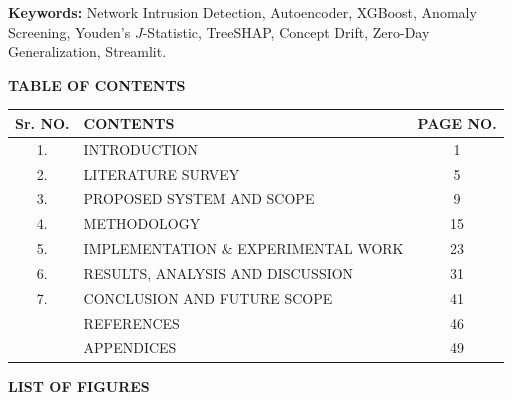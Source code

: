\documentclass[12pt,a4paper]{report}
\begin{document}
\noindent
\textbf{Keywords:} Network Intrusion Detection, Autoencoder, XGBoost, Anomaly Screening, Youden's $J$-Statistic, TreeSHAP, Concept Drift, Zero-Day Generalization, Streamlit.

\clearpage
{}
\setcounter{page}{6}
\thispagestyle{plain}

\begin{center}
{\Large\bfseries TABLE OF CONTENTS}\\[0.4cm]
\end{center}

\noindent
\begin{tabularx}{\textwidth}{|c|X|c|}
\hline
\textbf{Sr. NO.} & \textbf{\centering CONTENTS} & \textbf{PAGE NO.} \\
\hline
1. & INTRODUCTION & 1 \\
\hline
2. & LITERATURE SURVEY & 5 \\
\hline
3. & PROPOSED SYSTEM AND SCOPE & 9 \\
\hline
4. & METHODOLOGY & 15 \\
\hline
5. & IMPLEMENTATION \& EXPERIMENTAL WORK & 23 \\
\hline
6. & RESULTS, ANALYSIS AND DISCUSSION & 31 \\
\hline
7. & CONCLUSION AND FUTURE SCOPE & 41 \\
\hline
 & REFERENCES & 46 \\
\hline
 & APPENDICES & 49 \\
\hline
\end{tabularx}

\clearpage
{}
\setcounter{page}{7}
\thispagestyle{plain}

\begin{center}
{\Large\bfseries LIST OF FIGURES}\\[0.4cm]
\end{center}
\end{document}

